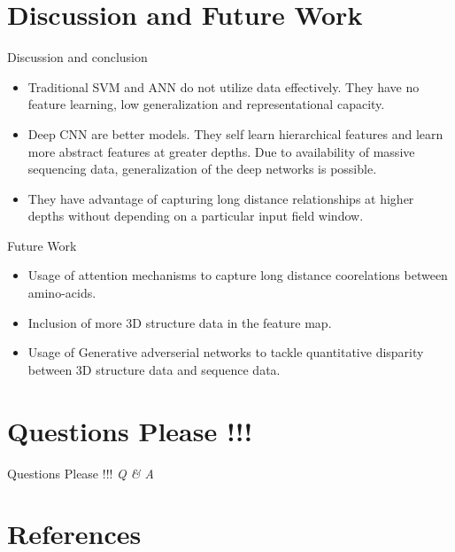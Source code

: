 \documentclass{beamer}
\begin{document}
\section{Discussion and Future Work}

\begin{frame}[t]{Discussion and conclusion}
\begin{itemize}
\item Traditional SVM and ANN do not utilize data effectively.  They have no feature learning, 
low generalization and representational capacity.
\item Deep CNN are better models. They  self learn hierarchical features and learn more abstract features at greater depths. Due to availability of massive sequencing data, 
generalization of the deep networks is possible.
\item They have advantage of capturing long distance relationships at higher depths without depending on a particular input field window.
\end{itemize}
\end{frame}

\begin{frame}[t]{Future Work}
\begin{itemize}
\item Usage of attention mechanisms to capture long distance coorelations between
amino-acids.
\item Inclusion of more 3D structure data in the feature map.
\item Usage of Generative adverserial networks to tackle quantitative disparity between
3D structure data and sequence data.
\end{itemize}
\end{frame}

\section{Questions Please !!!}

\begin{frame}[t]{Questions Please !!!}
  \centering \Huge
  \emph{Q \& A}
\end{frame}

\section{References}
\end{document}
